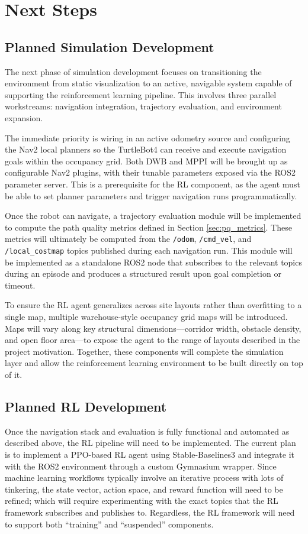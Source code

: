 \documentclass[conference]{IEEEtran}
\begin{document}
\section{Next Steps}
    \subsection{Planned Simulation Development}
    The next phase of simulation development focuses on transitioning the environment from static visualization to an active, navigable system capable of supporting the reinforcement learning pipeline. This involves three parallel workstreams: navigation integration, trajectory evaluation, and environment expansion.

    The immediate priority is wiring in an active odometry source and configuring the Nav2 local planners so the TurtleBot4 can receive and execute navigation goals within the occupancy grid. Both DWB and MPPI will be brought up as configurable Nav2 plugins, with their tunable parameters exposed via the ROS2 parameter server. This is a prerequisite for the RL component, as the agent must be able to set planner parameters and trigger navigation runs programmatically.

    Once the robot can navigate, a trajectory evaluation module will be implemented to compute the path quality metrics defined in Section \ref{sec:pq_metrics}. These metrics will ultimately be computed from the \texttt{/odom}, \texttt{/cmd\_vel}, and \texttt{/local\_costmap} topics published during each navigation run. This module will be implemented as a standalone ROS2 node that subscribes to the relevant topics during an episode and produces a structured result upon goal completion or timeout.

    To ensure the RL agent generalizes across site layouts rather than overfitting to a single map, multiple warehouse-style occupancy grid maps will be introduced. Maps will vary along key structural dimensions---corridor width, obstacle density, and open floor area---to expose the agent to the range of layouts described in the project motivation. Together, these components will complete the simulation layer and allow the reinforcement learning environment to be built directly on top of it.

    \subsection{Planned RL Development}
    Once the navigation stack and evaluation is fully functional and automated as described above, the RL pipeline will need to be implemented. The current plan is to implement a PPO-based RL agent using Stable-Baselines3 and integrate it with the ROS2 environment through a custom Gymnasium wrapper. Since machine learning workflows typically involve an iterative process with lots of tinkering, the state vector, action space, and reward function will need to be refined; which will require experimenting with the exact topics that the RL framework subscribes and publishes to. Regardless, the RL framework will need to support both ``training'' and ``suspended'' components. 
    
\end{document}
